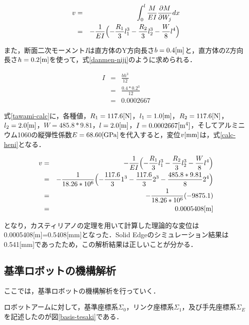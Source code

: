 \begin{eqnarray}
  v &=& \int_0^l \frac{M}{EI}\frac{\partial M}{\partial W_{j}}dx \nonumber \\
    &=& -\frac{1}{EI} \Bigl( -\frac{R_1}{3}l_1^3 - \frac{R_2}{3}l_2^3 - \frac{W}{8}l^4\Bigr)
  \label{tawami-calc}
\end{eqnarray}

また，断面二次モーメント\(I\)は直方体のY方向長さ\(b=0.4[\rm m]\)と，直方体のZ方向長さ\(h=0.2[\rm m]\)を使って，式\ref{danmen-niji}のように求められる．

\begin{eqnarray}
  I &=& \frac{bh^3}{12} \nonumber \\
    &=& \frac{0.4*0.2^3}{12} \nonumber \\
    &=& 0.0002667
  \label{danmen-niji}
\end{eqnarray}

式\ref{tawami-calc}に，各種値，\(R_1=117.6[\rm N]\)，\(l_1=1.0[\rm m]\)，\(R_2=117.6[\rm N]\)，\(l_2=2.0[\rm m]\)，\(W=485.8*9.81\)，\(l=2.0[\rm m]\)，\(I=0.0002667[\rm m^4]\)，そしてアルミニウム1060の縦弾性係数\(E=68.60[\rm GPa]\)を代入すると，変位\(v[\rm mm]\)は，式\ref{calc-heni}となる．

\begin{eqnarray}
  v &=& -\frac{1}{EI} \Bigl( -\frac{R_1}{3}l_1^3 - \frac{R_2}{3}l_2^3 - \frac{W}{8}l^4\Bigr) \nonumber \\
    &=& -\frac{1}{18.26 * 10^6} \Bigl( -\frac{117.6}{3}1^3 - \frac{117.6}{3}2^3 - \frac{485.8*9.81}{8}2^4\Bigr) \nonumber \\
    &=& -\frac{1}{18.26 * 10^6} (-9875.1) \nonumber \\
    &=& 0.0005408[\rm m]
  \label{calc-heni}
\end{eqnarray}

となり，カスティリアノの定理を用いて計算した理論的な変位は0.0005408{[}m{]}=0.5408{[}mm{]}となった．Solid
Edgeのシミュレーション結果は0.541{[}mm{]}であったため，この解析結果は正しいことが分かる．

\subsection{基準ロボットの機構解析}\label{ux57faux6e96ux30edux30dcux30c3ux30c8ux306eux6a5fux69cbux89e3ux6790}

ここでは，基準ロボットの機構解析を行っていく．

ロボットアームに対して，基準座標系\(\Sigma_0\)，リンク座標系\(\Sigma_1\)，及び手先座標系\(\Sigma_E\)を記述したのが図\ref{basis-tesaki}である．

